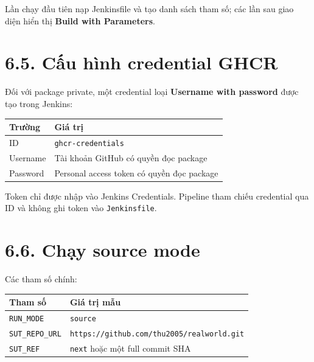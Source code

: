 \documentclass[
  vietnamese,
  12pt,
  a4paper,
  oneside]{report}
\begin{document}
Lần chạy đầu tiên nạp Jenkinsfile và tạo danh sách tham số; các lần sau
giao diện hiển thị \textbf{Build with Parameters}.

\section{6.5. Cấu hình credential
GHCR}\label{65-cux1ea5u-huxecnh-credential-ghcr}

Đối với package private, một credential loại \textbf{Username with
password} được tạo trong Jenkins:

\begin{longtable}[]{@{}
  >{\raggedright\arraybackslash}p{}
  >{\raggedright\arraybackslash}p{}@{}}
\toprule\noalign{}
\begin{minipage}[b]{\linewidth}\raggedright
Trường
\end{minipage} & \begin{minipage}[b]{\linewidth}\raggedright
Giá trị
\end{minipage} \\
\midrule\noalign{}
\endhead
\bottomrule\noalign{}
\endlastfoot
ID & \texttt{ghcr-credentials} \\
Username & Tài khoản GitHub có quyền đọc package \\
Password & Personal access token có quyền đọc package \\
\end{longtable}

Token chỉ được nhập vào Jenkins Credentials. Pipeline tham chiếu
credential qua ID và không ghi token vào \texttt{Jenkinsfile}.

\section{6.6. Chạy source mode}\label{66-chux1ea1y-source-mode}

Các tham số chính:

\begin{longtable}[]{@{}
  >{\raggedright\arraybackslash}p{}
  >{\raggedright\arraybackslash}p{}@{}}
\toprule\noalign{}
\begin{minipage}[b]{\linewidth}\raggedright
Tham số
\end{minipage} & \begin{minipage}[b]{\linewidth}\raggedright
Giá trị mẫu
\end{minipage} \\
\midrule\noalign{}
\endhead
\bottomrule\noalign{}
\endlastfoot
\texttt{RUN\_MODE} & \texttt{source} \\
\texttt{SUT\_REPO\_URL} &
\nolinkurl{https://github.com/thu2005/realworld.git} \\
\texttt{SUT\_REF} & \texttt{next} hoặc một full commit SHA \\
\end{longtable}
\end{document}

